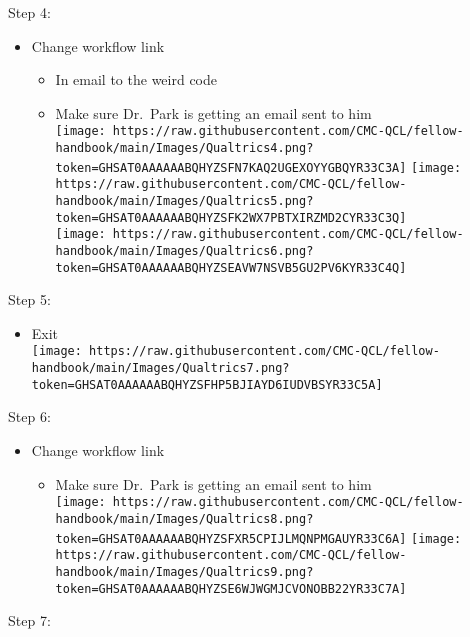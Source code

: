 \documentclass[
]{book}
\providecommand{\tightlist}{%
  \setlength{\itemsep}{0pt}\setlength{\parskip}{0pt}}
\begin{document}
Step 4:

\begin{itemize}
\tightlist
\item
  Change workflow link

  \begin{itemize}
  \tightlist
  \item
    In email to the weird code\\
  \item
    Make sure Dr.~Park is getting an email sent to him\\
    \texttt{[image: https://raw.githubusercontent.com/CMC-QCL/fellow-handbook/main/Images/Qualtrics4.png?token=GHSAT0AAAAAABQHYZSFN7KAQ2UGEXOYYGBQYR33C3A]}
    \texttt{[image: https://raw.githubusercontent.com/CMC-QCL/fellow-handbook/main/Images/Qualtrics5.png?token=GHSAT0AAAAAABQHYZSFK2WX7PBTXIRZMD2CYR33C3Q]}\\
    \texttt{[image: https://raw.githubusercontent.com/CMC-QCL/fellow-handbook/main/Images/Qualtrics6.png?token=GHSAT0AAAAAABQHYZSEAVW7NSVB5GU2PV6KYR33C4Q]}
  \end{itemize}
\end{itemize}

Step 5:

\begin{itemize}
\tightlist
\item
  Exit\\
  \texttt{[image: https://raw.githubusercontent.com/CMC-QCL/fellow-handbook/main/Images/Qualtrics7.png?token=GHSAT0AAAAAABQHYZSFHP5BJIAYD6IUDVBSYR33C5A]}
\end{itemize}

Step 6:

\begin{itemize}
\tightlist
\item
  Change workflow link

  \begin{itemize}
  \tightlist
  \item
    Make sure Dr.~Park is getting an email sent to him\\
    \texttt{[image: https://raw.githubusercontent.com/CMC-QCL/fellow-handbook/main/Images/Qualtrics8.png?token=GHSAT0AAAAAABQHYZSFXR5CPIJLMQNPMGAUYR33C6A]}
    \texttt{[image: https://raw.githubusercontent.com/CMC-QCL/fellow-handbook/main/Images/Qualtrics9.png?token=GHSAT0AAAAAABQHYZSE6WJWGMJCVONOBB22YR33C7A]}
  \end{itemize}
\end{itemize}

Step 7:
\end{document}
